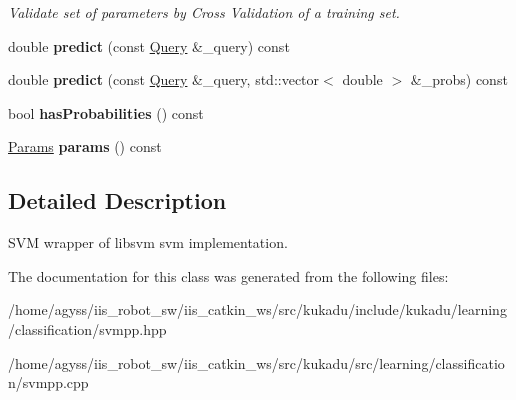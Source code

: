 \begin{DoxyCompactItemize}
\begin{DoxyCompactList}\small\item\em Validate set of parameters by Cross Validation of a training set. \end{DoxyCompactList}\item 
double {\bfseries predict} (const \hyperlink{structsvmpp_1_1Query}{Query} \&\+\_\+query) const \hypertarget{classsvmpp_1_1Svm_a4d6ce19c4fd3a030e3c089242950e606}{}\label{classsvmpp_1_1Svm_a4d6ce19c4fd3a030e3c089242950e606}

\item 
double {\bfseries predict} (const \hyperlink{structsvmpp_1_1Query}{Query} \&\+\_\+query, std\+::vector$<$ double $>$ \&\+\_\+probs) const \hypertarget{classsvmpp_1_1Svm_ad4e53d15c28916ca4a3b5d81d529e2e0}{}\label{classsvmpp_1_1Svm_ad4e53d15c28916ca4a3b5d81d529e2e0}

\item 
bool {\bfseries has\+Probabilities} () const \hypertarget{classsvmpp_1_1Svm_a1bd8ee7b468a803dcd581c20511d703d}{}\label{classsvmpp_1_1Svm_a1bd8ee7b468a803dcd581c20511d703d}

\item 
\hyperlink{classsvmpp_1_1Svm_a5ec13b8f62c2deb4b4229a2305c32c03}{Params} {\bfseries params} () const \hypertarget{classsvmpp_1_1Svm_a7b81a896d49b13c24d61a5b08f4d33b2}{}\label{classsvmpp_1_1Svm_a7b81a896d49b13c24d61a5b08f4d33b2}

\end{DoxyCompactItemize}


\subsection{Detailed Description}
S\+VM wrapper of libsvm svm implementation. 

The documentation for this class was generated from the following files\+:\begin{DoxyCompactItemize}
\item 
/home/agyss/iis\+\_\+robot\+\_\+sw/iis\+\_\+catkin\+\_\+ws/src/kukadu/include/kukadu/learning/classification/svmpp.\+hpp\item 
/home/agyss/iis\+\_\+robot\+\_\+sw/iis\+\_\+catkin\+\_\+ws/src/kukadu/src/learning/classification/svmpp.\+cpp\end{DoxyCompactItemize}
